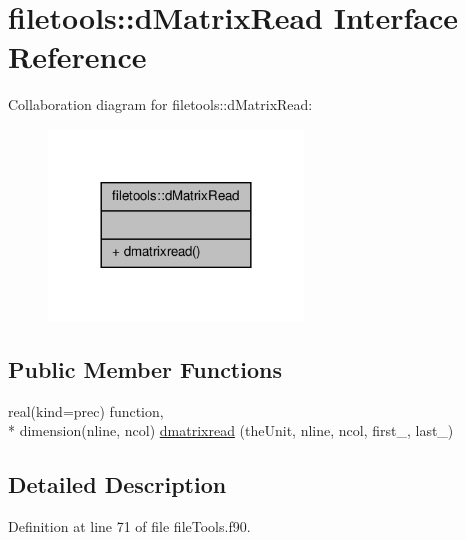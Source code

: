 \hypertarget{interfacefiletools_1_1d_matrix_read}{\section{filetools\-:\-:d\-Matrix\-Read Interface Reference}
\label{interfacefiletools_1_1d_matrix_read}
}


Collaboration diagram for filetools\-:\-:d\-Matrix\-Read\-:\nopagebreak
\begin{figure}[H]
\begin{center}
\leavevmode
\includegraphics[width=192pt]{interfacefiletools_1_1d_matrix_read__coll__graph}
\end{center}
\end{figure}
\subsection*{Public Member Functions}
\begin{DoxyCompactItemize}
\item 
real(kind=prec) function, \\*
dimension(nline, ncol) \hyperlink{interfacefiletools_1_1d_matrix_read_af22620390ccf8978e358e97bcf141bd0}{dmatrixread} (the\-Unit, nline, ncol, first\-\_\-, last\-\_\-)
\end{DoxyCompactItemize}


\subsection{Detailed Description}


Definition at line 71 of file file\-Tools.\-f90.




